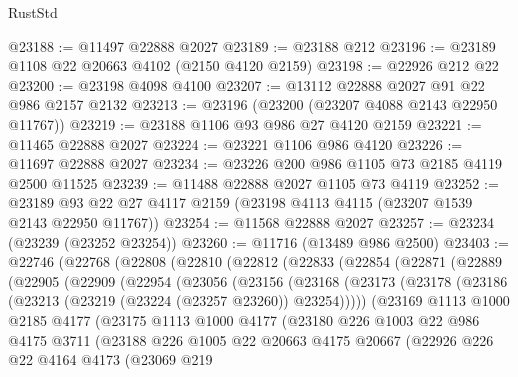 \begin{lexlean}{RustStd}
\begin{coremodule}
@23188 := @11497 @22888 @2027
@23189 := @23188 @212
@23196 := @23189 @1108 @22 @20663 @4102 (@2150 @4120 @2159)
@23198 := @22926 @212 @22
@23200 := @23198 @4098 @4100
@23207 := @13112 @22888 @2027 @91 @22 @986 @2157 @2132
@23213 := @23196 (@23200 (@23207 @4088 @2143 @22950 @11767))
@23219 := @23188 @1106 @93 @986 @27 @4120 @2159
@23221 := @11465 @22888 @2027
@23224 := @23221 @1106 @986 @4120
@23226 := @11697 @22888 @2027
@23234 := @23226 @200 @986 @1105 @73 @2185 @4119 @2500 @11525
@23239 := @11488 @22888 @2027 @1105 @73 @4119
@23252 := @23189 @93 @22 @27 @4117 @2159 (@23198 @4113 @4115 (@23207 @1539 @2143 @22950 @11767))
@23254 := @11568 @22888 @2027
@23257 := @23234 (@23239 (@23252 @23254))
@23260 := @11716 (@13489 @986 @2500)
@23403 := @22746
    (@22768
      (@22808
        (@22810
          (@22812
            (@22833
              (@22854
                (@22871
                  (@22889
                    (@22905
                      (@22909
                        (@22954
                          (@23056
                            (@23156
                              (@23168
                                (@23173
                                  (@23178
                                    (@23186 (@23213 (@23219 (@23224 (@23257 @23260)) @23254)))))
                                (@23169
                                  @1113
                                  @1000
                                  @2185
                                  @4177
                                  (@23175
                                    @1113
                                    @1000
                                    @4177
                                    (@23180
                                      @226
                                      @1003
                                      @22
                                      @986
                                      @4175
                                      @3711
                                      (@23188
                                        @226
                                        @1005
                                        @22
                                        @20663
                                        @4175
                                        @20667
                                        (@22926
                                          @226
                                          @22
                                          @4164
                                          @4173
                                          (@23069
                                            @219

\end{coremodule}
\end{lexlean}
